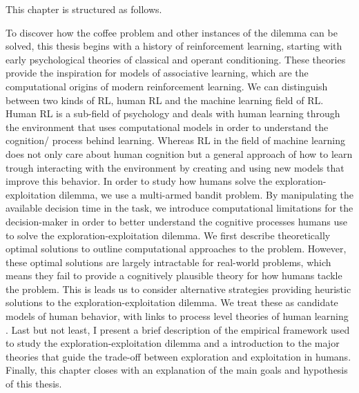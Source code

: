  
This chapter is structured as follows. %

To discover how the coffee problem and other instances of the dilemma can be solved, this thesis begins with a history of reinforcement learning, starting with early psychological theories of classical and operant conditioning. %
These theories provide the inspiration for models of associative learning, which are the computational origins of modern reinforcement learning. We can distinguish between two kinds of RL, human RL and the machine learning field of RL. Human RL is a sub-field of psychology and deals with human learning through the environment that uses computational models in order to understand the cognition/ process behind learning. Whereas RL in the field of machine learning does not only care about human cognition but a general approach of how to learn trough interacting with the environment by creating and using new models that improve this behavior. 
In order to study how humans solve the exploration-exploitation dilemma, we use a multi-armed bandit problem. %
By manipulating the available decision time in the task, we introduce computational limitations for the decision-maker in order to better understand the cognitive processes humans use to solve the exploration-exploitation dilemma. %
We first describe theoretically optimal solutions to outline computational approaches to the problem. However, these optimal solutions are largely intractable for real-world problems, which means they fail to provide a cognitively plausible theory for how humans tackle the problem. 
This is leads us to consider alternative strategies providing heuristic solutions to the exploration-exploitation dilemma. We treat these as candidate models of human behavior, with links to process level theories of human learning \citep{marr1976understanding}. 
Last but not least, I present a brief description of the empirical framework used to study the exploration-exploitation dilemma and a introduction to the major theories that guide the trade-off between exploration and exploitation in humans. 
Finally, this chapter closes with an explanation of the main goals and hypothesis of this thesis. 

